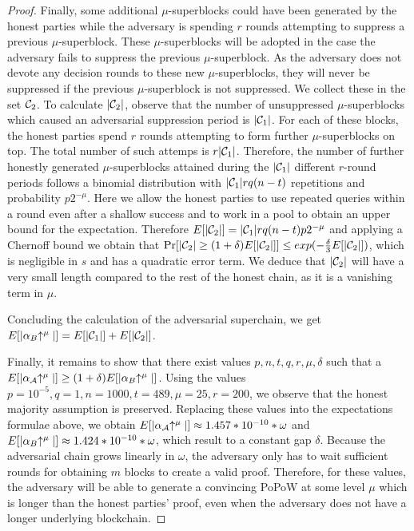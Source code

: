 \begin{proof}
Finally, some additional $\mu$-superblocks could have been generated by the
honest parties while the adversary is spending $r$ rounds attempting to suppress
a previous $\mu$-superblock. These $\mu$-superblocks will be adopted in the case
the adversary fails to suppress the previous $\mu$-superblock. As the adversary
does not devote any decision rounds to these new $\mu$-superblocks, they will
never be suppressed if the previous $\mu$-superblock is not suppressed. We
collect these in the set $\mathcal{C}_2$. To calculate $|\mathcal{C}_2|$, observe that the
number of unsuppressed $\mu$-superblocks which caused an adversarial suppression
period is $|\mathcal{C}_1|$. For each of these blocks, the honest parties spend $r$
rounds attempting to form further $\mu$-superblocks on top. The total number of
such attemps is $r|\mathcal{C}_1|$. Therefore, the number of further honestly
generated $\mu$-superblocks attained during the $|\mathcal{C}_1|$ different $r$-round
periods follows a binomial distribution with $|\mathcal{C}_1|rq(n - t)$ repetitions
and probability $p2^{-\mu}$. Here we allow the honest parties to use repeated
queries within a round even after a shallow success and to work in a pool
to obtain an upper bound for the expectation. Therefore $E[|\mathcal{C}_2|] =
|\mathcal{C}_1|rq(n - t)p2^{-\mu}$ and applying a Chernoff bound we obtain that
$\Pr[|\mathcal{C}_2| \geq (1 + \delta)E[|\mathcal{C}_2|]] \leq
exp(-\frac{\delta}{3}E[|\mathcal{C}_2|])$, which is negligible in $s$ and has a
quadratic error term. We deduce that $|\mathcal{C}_2|$ will have a very small length
compared to the rest of the honest chain, as it is a vanishing term in $\mu$.

Concluding the calculation of the adversarial superchain, we get
$E[|\alpha_B\negthickspace\uparrow^\mu|] = E[|\mathcal{C}_1|] + E[|\mathcal{C}_2|]$.

Finally, it remains to show that there exist values $p, n, t, q, r, \mu, \delta$
such that a $E[|\alpha_\mathcal{A}\negthickspace\uparrow^\mu|] \geq (1 +
\delta)E[|\alpha_B\negthickspace\uparrow^\mu|]$.
Using the values $p = 10^{-5}, q = 1, n =
1000, t = 489, \mu = 25, r = 200$, we observe that the honest majority
assumption is preserved. Replacing these values into the expectations formulae
above, we obtain $E[|\alpha_\mathcal{A}\negthickspace\uparrow^\mu|] \approx 1.457 * 10^{-10} *
\omega$ and $E[|\alpha_B\negthickspace\uparrow^\mu|] \approx 1.424 * 10^{-10} * \omega$, which
result to a constant gap $\delta$. Because the adversarial chain grows linearly
in $\omega$, the adversary only has to wait sufficient rounds for obtaining $m$
blocks to create a valid proof. Therefore, for these values, the adversary
will be able to generate a convincing PoPoW at some level $\mu$ which is longer
than the honest parties' proof, even when the adversary does not have a longer
underlying blockchain.
\Qed
\end{proof}
